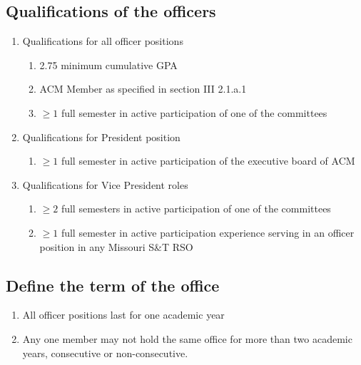   \subsection{Qualifications of the officers}
    \begin{enumerate}[label=\arabic*.]
      \item Qualifications for all officer positions
        \begin{enumerate}[label=\arabic*.]
          \item 2.75 minimum cumulative GPA
          \item ACM Member as specified in section III 2.1.a.1
          \item $\geq{1}$ full semester in active participation of one of the
          committees
        \end{enumerate}
      \item Qualifications for President position
        \begin{enumerate}[label=\arabic*.]
          \item $\geq{1}$ full semester in active participation of the executive
          board of ACM
        \end{enumerate}
      \item Qualifications for Vice President roles
        \begin{enumerate}[label=\arabic*.]
          \item $\geq{2}$ full semesters in active participation of one of the
          committees
          \item $\geq{1}$ full semester in active participation experience
          serving in an officer position in any Missouri S\&T RSO
        \end{enumerate}
    \end{enumerate}
 
  \subsection{Define the term of the office}
    \begin{enumerate}[label=\arabic*.]
      \item All officer positions last for one academic year
      \item Any one member may not hold the same office for more than two
      academic years, consecutive or non-consecutive.
    \end{enumerate}
